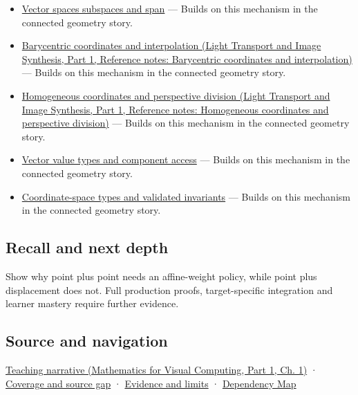 \hypertarget{appendix-0659864c0aa3-used-by}{}

\begin{itemize}
\tightlist
\item
  \hyperref[appendix-173b52c063ae]{Vector spaces subspaces and span} --- Builds on this mechanism in the connected geometry story.
\item
  \href{../04-Light-Transport-and-Image-Synthesis-P01/main.pdf\#appendix-02b9d9a81dca}{Barycentric coordinates and interpolation (Light Transport and Image Synthesis, Part 1, Reference notes: Barycentric coordinates and interpolation)} --- Builds on this mechanism in the connected geometry story.
\item
  \href{../04-Light-Transport-and-Image-Synthesis-P01/main.pdf\#appendix-cb3b26862282}{Homogeneous coordinates and perspective division (Light Transport and Image Synthesis, Part 1, Reference notes: Homogeneous coordinates and perspective division)} --- Builds on this mechanism in the connected geometry story.
\item
  \hyperref[appendix-37a39984ba66]{Vector value types and component access} --- Builds on this mechanism in the connected geometry story.
\item
  \hyperref[appendix-380a220e2529]{Coordinate-space types and validated invariants} --- Builds on this mechanism in the connected geometry story.
\end{itemize}

\subsection{Recall and next depth}\label{appendix-0659864c0aa3-recall-and-next-depth}

\hypertarget{appendix-0659864c0aa3-recall-and-next-depth}{}

Show why point plus point needs an affine-weight policy, while point plus displacement does not. Full production proofs, target-specific integration and learner mastery require further evidence.

\subsection{Source and navigation}\label{appendix-0659864c0aa3-source-and-navigation}

\hypertarget{appendix-0659864c0aa3-source-and-navigation}{}

\href{../02-Mathematics-for-Visual-Computing-P01/main.pdf\#01-foundations-i-ch017-an-arrow-is-not-the-address-written-beside-it}{Teaching narrative (Mathematics for Visual Computing, Part 1, Ch. 1)} · \hyperref[appendix-fd090d982a15-phase-6---parts-501-600]{Coverage and source gap} · \hyperref[appendix-a103e7846d21-phase-6---source-analysis-and-verification]{Evidence and limits} · \hyperref[appendix-4ad47bdd269a]{Dependency Map}
